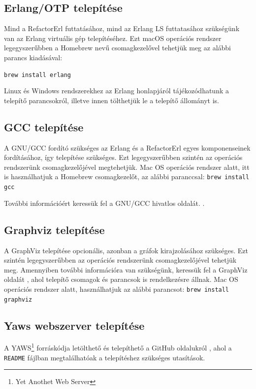 \subsection{Erlang/OTP telepítése}

Mind a RefactorErl futtatásához, mind az Erlang LS futtatasához szükségünk van az Erlang virtuális gép telepítéséhez. Ezt macOS operációs rendszer legegyszerűbben a Homebrew \cite{homebrew} nevű csomagkezelővel tehetjük meg az alábbi parancs kiadásával:

\noindent \lstinline{brew install erlang}

Linux és Windows rendszerekhez az Erlang honlapjáról \cite{erlangDownloads} tájékozódhatunk a telepítő parancsokról, illetve innen tölthetjük le a telepítő állományt is.

\subsection{GCC telepítése}
A GNU/GCC fordító szükséges az Erlang és a RefactorErl egyes komponenseinek fordításához, így telepítése szükséges. Ezt legegyszerűbben szintén az operációs rendszerünk csomagkezelőjével megtehetjük. Mac OS operációs rendszer alatt, itt is használhatjuk a Homebrew \cite{homebrew} csomagkezelőt, az alábbi paranccsal:
\noindent \lstinline{brew install gcc}

További információért keressük fel a GNU/GCC hivatlos oldalát. \cite{gnuGcc}.

\subsection{Graphviz telepítése}
A GraphViz telepítése opcionális, azonban a gráfok kirajzolásához szükséges. Ezt szintén legegyszerűbben az operációs rendszerünk csomagkezelőjével tehetjük meg. Amennyiben további információra van szükségünk, keressük fel a GraphViz oldalát \cite{graphviz}, ahol telepítő csomagok és parancsok is rendelkezésre állnak.
Mac OS operációs rendszer alatt, használhatjuk az alábbi parancsot:
\noindent \lstinline{brew install graphviz}

\subsection{Yaws webszerver telepítése}
A YAWS\footnote{Yet Anothet Web Server} forráskódja letölthető és telepíthető a GitHub oldalukról \cite{yawsGithub}, ahol a \lstinline{README} fájlban megtalálhatóak a telepítéshez szükséges utasítások.

